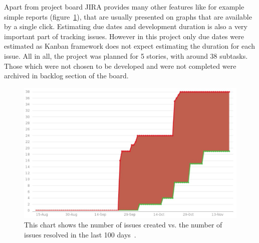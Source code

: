 \documentclass[a4paper,12pt]{book}
\begin{document}
{\bigskip
Apart from project board JIRA provides many other features like for example simple reports (figure~\ref{fig:report}), that are usually presented on graphs that are available by a single click.      
Estimating due dates and development duration is also a very important part of tracking issues. However in this project only due dates were estimated  as Kanban framework does not expect estimating the duration for each issue. All in all, the project was planned for 5 stories, with around 38 subtasks. Those which were not chosen to be developed and were not completed were archived in backlog section of the board.

\begin{figure}[H]
  \centering
    \includegraphics[width=1.0\textwidth]{chart1}
    \caption{ This chart shows the number of issues created vs. the number of issues resolved in the last 100 days~\cite{jiraboard}.}
    \label{fig:report}
\end{figure}
    
}
\end{document}
